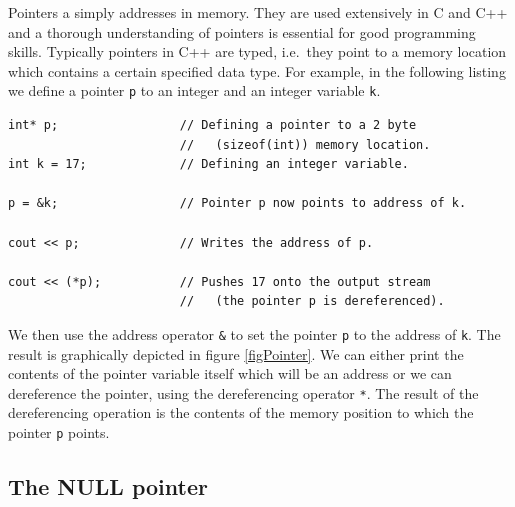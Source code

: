 
Pointers a simply addresses in memory. They are used extensively
in C and C++ and a thorough understanding of pointers is
essential for good programming skills. Typically pointers
in C++ are typed, i.e.\ they point to a memory location which
contains a certain specified data type. For example, in the following
listing we define a pointer \verb+p+ to an integer and an
integer variable \verb+k+.
{\small \begin{verbatim}
int* p;                 // Defining a pointer to a 2 byte
                        //   (sizeof(int)) memory location.
int k = 17;             // Defining an integer variable.

p = &k;                 // Pointer p now points to address of k.

cout << p;              // Writes the address of p.

cout << (*p);           // Pushes 17 onto the output stream
                        //   (the pointer p is dereferenced).
\end{verbatim}}
\noindent
We then use the address operator \verb+&+ to set the pointer \verb+p+
to the address of \verb+k+.
The result is graphically depicted in figure \ref{figPointer}.
We can 
either print the contents of the pointer variable itself which
will be an address or we can dereference the pointer, using the
dereferencing operator \verb+*+. The result of the dereferencing
operation is the contents of the memory position to which
the pointer \verb+p+ points.


\subsection{The NULL pointer}


